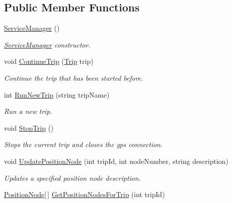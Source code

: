 \subsection*{Public Member Functions}
\begin{DoxyCompactItemize}
\item 
\hyperlink{class_tripi_1_1wcf_1_1_service_manager_add232278af04b6e75666dbccfa6f067c}{ServiceManager} ()
\begin{DoxyCompactList}\small\item\em \hyperlink{class_tripi_1_1wcf_1_1_service_manager}{ServiceManager} constructor. \item\end{DoxyCompactList}\item 
void \hyperlink{class_tripi_1_1wcf_1_1_service_manager_a952bc21f58ae1141773be7f75e9d19dd}{ContinueTrip} (\hyperlink{class_trip}{Trip} trip)
\begin{DoxyCompactList}\small\item\em Continue the trip that has been started before. \item\end{DoxyCompactList}\item 
int \hyperlink{class_tripi_1_1wcf_1_1_service_manager_aa7a1b427d211e36ec4173a41d7df66e6}{RunNewTrip} (string tripName)
\begin{DoxyCompactList}\small\item\em Run a new trip. \item\end{DoxyCompactList}\item 
void \hyperlink{class_tripi_1_1wcf_1_1_service_manager_a0de7350349e729fbef9811a28976b1a3}{StopTrip} ()
\begin{DoxyCompactList}\small\item\em Stops the current trip and closes the gps connection. \item\end{DoxyCompactList}\item 
void \hyperlink{class_tripi_1_1wcf_1_1_service_manager_a08f7d328c2d5a4d7906a8d4acb6e197d}{UpdatePositionNode} (int tripId, int nodeNumber, string description)
\begin{DoxyCompactList}\small\item\em Updates a specified position node description. \item\end{DoxyCompactList}\item 
\hyperlink{class_position_node}{PositionNode}\mbox{[}$\,$\mbox{]} \hyperlink{class_tripi_1_1wcf_1_1_service_manager_a45d966e10a20b29bb2816e96f9749988}{GetPositionNodesForTrip} (int tripId)

\end{DoxyCompactItemize}
